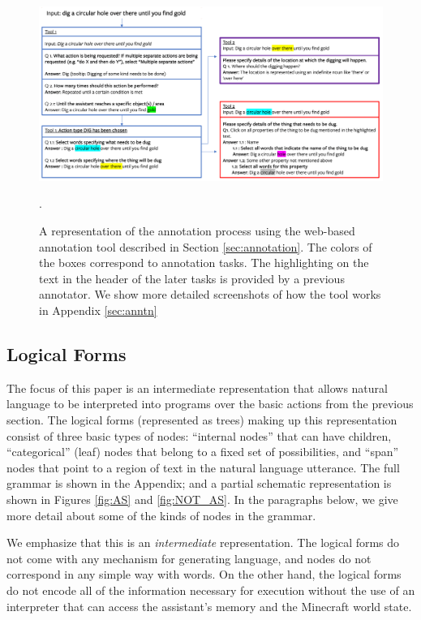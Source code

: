 \begin{figure}
\center
 \includegraphics[width=\linewidth, height=6 cm  ]{figures/tools_diagram2.png}
 \caption{A representation of the annotation process using the web-based annotation tool described in Section \ref{sec:annotation}.  The colors of the boxes correspond to annotation tasks.  The highlighting on the text in the header of the later tasks is provided by a previous annotator.  We show more detailed screenshots of how the tool works in Appendix \ref{sec:anntn}}.
\label{fig:tool}
\end{figure}

\subsection{Logical Forms}
The focus of this paper is an intermediate representation that allows natural language to be interpreted into programs over the basic actions from the previous section. 
The logical forms (represented as trees) making up this representation consist of three basic types of nodes: ``internal nodes'' that can have children, ``categorical'' (leaf) nodes that belong to a fixed set of possibilities, and ``span'' nodes that point to a region of text in the natural language utterance.   The full grammar is shown in the Appendix; and a partial schematic representation is shown in Figures \ref{fig:AS} and \ref{fig:NOT_AS}.  In the paragraphs below, we give more detail about some of the kinds of nodes in the grammar.     

We emphasize that this is an {\it intermediate} representation.   The logical forms do not come with any mechanism for generating language, and nodes do not correspond in any simple way with words.  On the other hand, the logical forms do not encode all of the information necessary for execution without the use of an interpreter that can access the assistant's memory and the Minecraft world state.   

